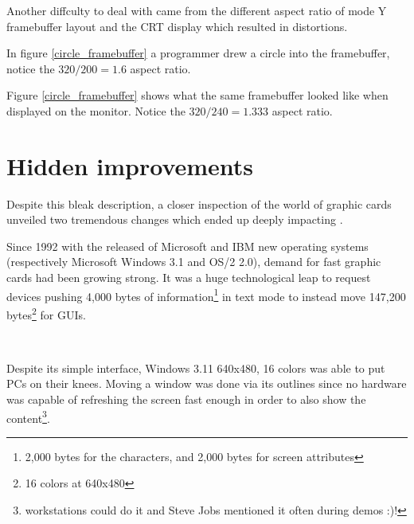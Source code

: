  \label{vga_ratio}
\par
\vspace{-2mm}
Another diffculty to deal with came from the different aspect ratio of mode Y framebuffer layout and the CRT display which resulted in distortions. \\
\par
{}
\par
In figure \ref{circle_framebuffer} a programmer drew a circle into the framebuffer, notice the $ 320/200 = 1.6 $ aspect ratio.\\
\par
{}
\par
Figure \ref{circle_framebuffer} shows what the same framebuffer looked like when displayed on the monitor. Notice the $ 320/240 = 1.333 $ aspect ratio.\\







\section{Hidden improvements}
Despite this bleak description, a closer inspection of the world of graphic cards unveiled two tremendous changes which ended up deeply impacting \doom. \\
\par
Since 1992 with the released of Microsoft and IBM new operating systems (respectively Microsoft Windows 3.1 and OS/2 2.0), demand for fast graphic cards had been growing strong. It was a huge technological leap to request devices pushing 4,000 bytes of information\footnote{2,000 bytes for the characters, and 2,000 bytes for screen attributes} in text mode to instead move 147,200 bytes\footnote{16 colors at 640x480} for GUIs.

\\
\par 
Despite its simple interface, Windows 3.11 640x480, 16 colors was able to put PCs on their knees. Moving a window was done via its outlines since no hardware was capable of refreshing the screen fast enough in order to also show the content\footnote{\NeXT workstations could do it and Steve Jobs mentioned it often during demos :)!}.



